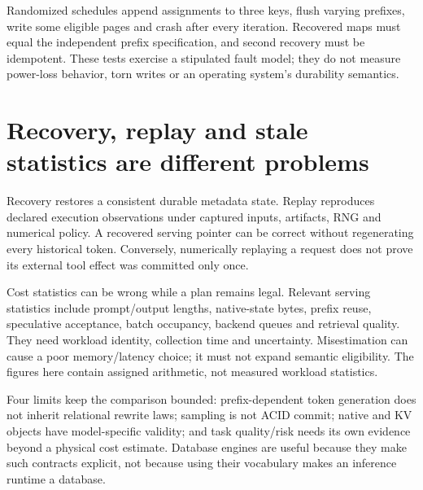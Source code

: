 Randomized schedules append assignments to three keys, flush varying prefixes,
write some eligible pages and crash after every iteration. Recovered maps
must equal the independent prefix specification, and second recovery must be
idempotent. These tests exercise a stipulated fault model; they do not measure
power-loss behavior, torn writes or an operating system's durability semantics.

\section{Recovery, replay and stale statistics are different problems}
\label{evod42:limits}
Recovery restores a consistent durable metadata state. Replay reproduces
declared execution observations under captured inputs, artifacts, RNG and
numerical policy. A recovered serving pointer can be correct without
regenerating every historical token. Conversely, numerically replaying a
request does not prove its external tool effect was committed only once.

Cost statistics can be wrong while a plan remains legal. Relevant serving
statistics include prompt/output lengths, native-state bytes, prefix reuse,
speculative acceptance, batch occupancy, backend queues and retrieval quality.
They need workload identity, collection time and uncertainty. Misestimation
can cause a poor memory/latency choice; it must not expand semantic eligibility.
The figures here contain assigned arithmetic, not measured workload statistics.

Four limits keep the comparison bounded: prefix-dependent token generation
does not inherit relational rewrite laws; sampling is not ACID commit; native
and KV objects have model-specific validity; and task quality/risk needs its
own evidence beyond a physical cost estimate. Database engines are useful
because they make such contracts explicit, not because using their vocabulary
makes an inference runtime a database.

